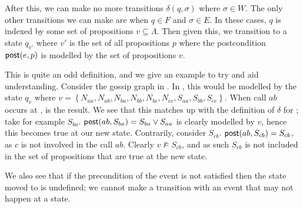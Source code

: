 \documentclass[12pt, a4paper]{article}
\begin{document}
\begin{wrapfigure}{r}{0.2\linewidth}
  \centering
  {
    \subcaption{}
    \label{fig:GossipWrap1}
  }
  {
    \subcaption{}
    \label{fig:GossipWrap2}
  }
  \caption{}
\end{wrapfigure}

After this, we can make no more transitions $\delta(q, \sigma)$ where $\sigma
\in W$. The only other transitions we can make are when $q \in F$ and $\sigma
\in E$. In these cases, $q$ is indexed by some set of propositions $v \subseteq
\Lambda$. Then given this, we transition to a state $q_{v'}$ where $v'$ is the
set of all propositions $p$ where the postcondition $\textsf{post}(e, p)$ is modelled by
the set of propositions $v$. 

This is quite an odd definition, and we give an example to try and aid
understanding. Consider the gossip graph in . In
\mestar, this would be modelled by the state $q_v$ where $v = \left\{ N_{aa},
  N_{ab}, N_{ba}, N_{bb}, N_{bc}, N_{cc}, S_{aa}, S_{bb}, S_{cc} \right\}$. When
call $ab$ occurs at ,  is the
result. We see that this matches up with the definition of $\delta$ for \mestar;
take for example $S_{ba}$. $\textsf{post}(ab, S_{ba}) = S_{ba} \lor S_{aa}$ is clearly
modelled by $v$, hence this becomes true at our new state. Contrarily, consider
$S_{cb}$. $\textsf{post}(ab, S_{cb}) = S_{cb}$, as $c$ is not involved in the call $ab$.
Clearly $v \not \models S_{cb}$, and as such $S_{cb}$ is not included in the set
of propositions that are true at the new state.

We also see that if the precondition of the event is not satisfied then the
state moved to is undefined; we cannot make a transition with an event that may
not happen at a state. 


\bigskip \bigskip \bigskip
\end{document}

